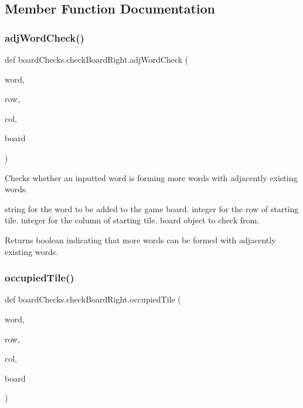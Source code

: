 \subsection{Member Function Documentation}
\mbox{\label{classboard_checks_1_1check_board_right_a92dfcdf78db9f0a5fe8848529987327a}} 
\subsubsection{\texorpdfstring{adj\+Word\+Check()}{adjWordCheck()}}
{\footnotesize\ttfamily def board\+Checks.\+check\+Board\+Right.\+adj\+Word\+Check (\begin{DoxyParamCaption}\item[{}]{word,  }\item[{}]{row,  }\item[{}]{col,  }\item[{}]{board }\end{DoxyParamCaption})}



Checks whether an inputted word is forming more words with adjacently existing words. 

string for the word to be added to the game board.  integer for the row of starting tile.  integer for the column of starting tile.  board object to check from. \begin{DoxyReturn}{Returns}
boolean indicating that more words can be formed with adjacently existing words. 
\end{DoxyReturn}
\mbox{\label{classboard_checks_1_1check_board_right_ad361fe238316b76956b1b2918143d069}} 
\subsubsection{\texorpdfstring{occupied\+Tile()}{occupiedTile()}}
{\footnotesize\ttfamily def board\+Checks.\+check\+Board\+Right.\+occupied\+Tile (\begin{DoxyParamCaption}\item[{}]{word,  }\item[{}]{row,  }\item[{}]{col,  }\item[{}]{board }\end{DoxyParamCaption})}



